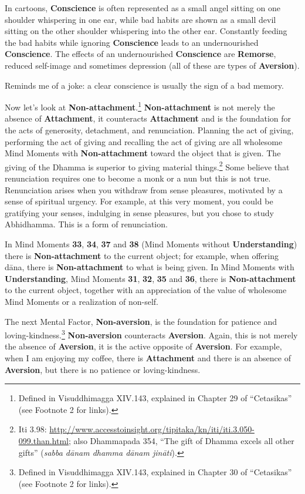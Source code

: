 In cartoons, \textbf{Conscience} is often represented as a small angel sitting on one shoulder whispering in one ear, while bad habits are shown as a small devil sitting on the other shoulder whispering into the other ear. Constantly feeding the bad habits while ignoring \textbf{Conscience} leads to an undernourished \textbf{Conscience}. The effects of an undernourished \textbf{Conscience} are \textbf{Remorse}, reduced self-image and sometimes depression (all of these are types of \textbf{Aversion}). 

Reminds me of a joke: a clear conscience is usually the sign of a bad memory.

Now let’s look at \textbf{Non-attachment}.\footnote{Defined in Visuddhimagga XIV.143, explained in Chapter 29 of “Cetasikas” (see Footnote 2 for links).} \textbf{Non-attachment} is not merely the absence of \textbf{Attachment}, it counteracts \textbf{Attachment} and is the foundation for the acts of generosity, detachment, and renunciation. Planning the act of giving, performing the act of giving and recalling the act of giving are all wholesome Mind Moments with \textbf{Non-attachment} toward the object that is given. The giving of the Dhamma is superior to giving material things.\footnote{Iti 3.98: \url{http://www.accesstoinsight.org/tipitaka/kn/iti/iti.3.050-099.than.html}; also Dhammapada 354, “The gift of Dhamma excels all other gifts” (\textit{sabba dānam dhamma dānam jināti}).} Some believe that renunciation requires one to become a monk or a nun but this is not true. Renunciation arises when you withdraw from sense pleasures, motivated by a sense of spiritual urgency. For example, at this very moment, you could be gratifying your senses, indulging in sense pleasures, but you chose to study Abhidhamma. This is a form of renunciation.

In Mind Moments \textbf{33}, \textbf{34}, \textbf{37} and \textbf{38} (Mind Moments without \textbf{Understanding}) there is \textbf{Non-attachment} to the current object; for example, when offering dāna, there is \textbf{Non-attachment} to what is being given. In Mind Moments with \textbf{Understanding}, Mind Moments \textbf{31}, \textbf{32}, \textbf{35} and \textbf{36}, there is \textbf{Non-attachment} to the current object, together with an appreciation of the value of wholesome Mind Moments or a realization of non-self.

The next Mental Factor, \textbf{Non-aversion}, is the foundation for patience and loving-kindness.\footnote{Defined in Visuddhimagga XIV.143, explained in Chapter 30 of “Cetasikas” (see Footnote 2 for links).} \textbf{Non-aversion} counteracts \textbf{Aversion}. Again, this is not merely the absence of \textbf{Aversion}, it is the active opposite of \textbf{Aversion}. For example, when I am enjoying my coffee, there is \textbf{Attachment} and there is an absence of \textbf{Aversion}, but there is no patience or loving-kindness.

